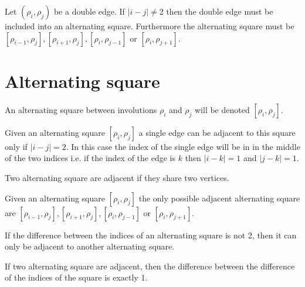 \begin{corollary}
  \label{continue-double-edge}
  Let $(\rho_i, \rho_j)$ be a double edge. If $|i - j| \neq 2$ then the double edge must be included into an alternating square. Furthermore the alternating square must be  $[\rho_{i-1}, \rho_j], [\rho_{i+1}, \rho_j], [\rho_i, \rho_{j-1}]$ or $[\rho_i, \rho_{j+1}]$.
\end{corollary}

\section{Alternating square}

\begin{notation}
  An alternating square between involutions $\rho_i$ and $\rho_j$ will be denoted $[\rho_i, \rho_j]$.
\end{notation}

\begin{proposition}
  \label{square-connection}
  Given an alternating square $[\rho_i, \rho_j]$ a single edge can be adjacent to this square only if $|i - j| = 2$. In this case the index of the single edge will be in in the middle of the two indices i.e. if the index of the edge is $k$ then $|i-k| = 1$ and $|j-k| = 1$.
\end{proposition}

\begin{definition}
  Two alternating square are adjacent if they share two vertices.
\end{definition}

\begin{proposition}
  \label{adjacent-squares}
  Given an alternating square $[\rho_i, \rho_j]$ the only possible adjacent alternating square are $[\rho_{i-1}, \rho_j], [\rho_{i+1}, \rho_j], [\rho_i, \rho_{j-1}]$ or $[\rho_i, \rho_{j+1}]$.
\end{proposition}

\begin{corollary}
  \label{continue-alternating-square}
  If the difference between the indices of an alternating square is not 2, then it can only be adjacent to another alternating square.
\end{corollary}

\begin{corollary}
  If two alternating square are adjacent, then the difference between the difference of the indices of the square is exactly 1.
\end{corollary}

